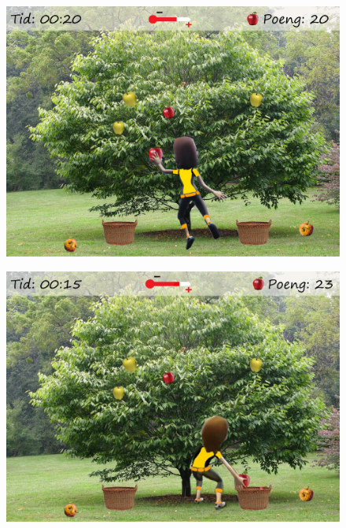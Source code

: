 \begin{figure} [H]
\centering
\includegraphics[scale=0.068]{gameappletree.jpg}
\label{fig:appleStretchNorsk}
\end{figure}

\begin{figure} [H]
\centering
\includegraphics[scale=0.3]{squateple.jpg}
\label{fig:appleSquatNorsk}
\end{figure}

